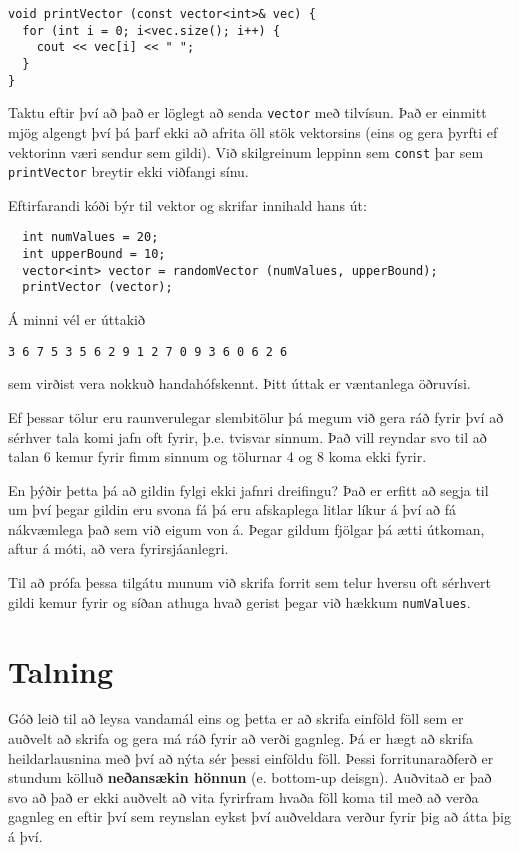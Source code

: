 \begin{verbatim}
void printVector (const vector<int>& vec) {
  for (int i = 0; i<vec.size(); i++) {
    cout << vec[i] << " ";
  }
}
\end{verbatim}
%
Taktu eftir því að það er löglegt að senda {\tt vector} með tilvísun.
Það er einmitt mjög algengt því þá þarf ekki að afrita öll stök vektorsins (eins og gera þyrfti ef vektorinn væri sendur sem gildi).
Við skilgreinum leppinn sem {\tt const} þar sem {\tt printVector} breytir ekki viðfangi sínu. 

Eftirfarandi kóði býr til vektor og skrifar innihald hans út: 

\begin{verbatim}
  int numValues = 20;
  int upperBound = 10;
  vector<int> vector = randomVector (numValues, upperBound);
  printVector (vector);
\end{verbatim}
%
Á minni vél er úttakið 

\begin{verbatim}
3 6 7 5 3 5 6 2 9 1 2 7 0 9 3 6 0 6 2 6 
\end{verbatim}
%
sem virðist vera nokkuð handahófskennt.  Þitt úttak er væntanlega öðruvísi.

Ef þessar tölur eru raunverulegar slembitölur þá megum við gera ráð fyrir því að sérhver tala komi jafn oft fyrir, þ.e. tvisvar sinnum.
Það vill reyndar svo til að talan 6 kemur fyrir fimm sinnum og tölurnar 4 og 8 koma ekki fyrir.

En þýðir þetta þá að gildin fylgi ekki jafnri dreifingu?
Það er erfitt að segja til um því þegar gildin eru svona fá þá eru afskaplega litlar líkur á því að fá nákvæmlega það sem við eigum von á.
Þegar gildum fjölgar þá ætti útkoman, aftur á móti, að vera fyrirsjáanlegri.

Til að prófa þessa tilgátu munum við skrifa forrit sem telur hversu oft sérhvert gildi kemur fyrir og síðan athuga hvað gerist
þegar við hækkum {\tt numValues}.

\section{Talning}
\label{counting}

Góð leið til að leysa vandamál eins og þetta er að skrifa einföld föll sem er auðvelt að skrifa og gera má ráð fyrir að verði gagnleg.
Þá er hægt að skrifa heildarlausnina með því að nýta sér þessi einföldu föll.
Þessi forritunaraðferð er stundum kölluð {\bf neðansækin hönnun} (e. bottom-up deisgn).
Auðvitað er það svo að það er ekki auðvelt að vita fyrirfram hvaða föll koma til með að verða gagnleg
en eftir því sem reynslan eykst því auðveldara verður fyrir þig að átta þig á því.

